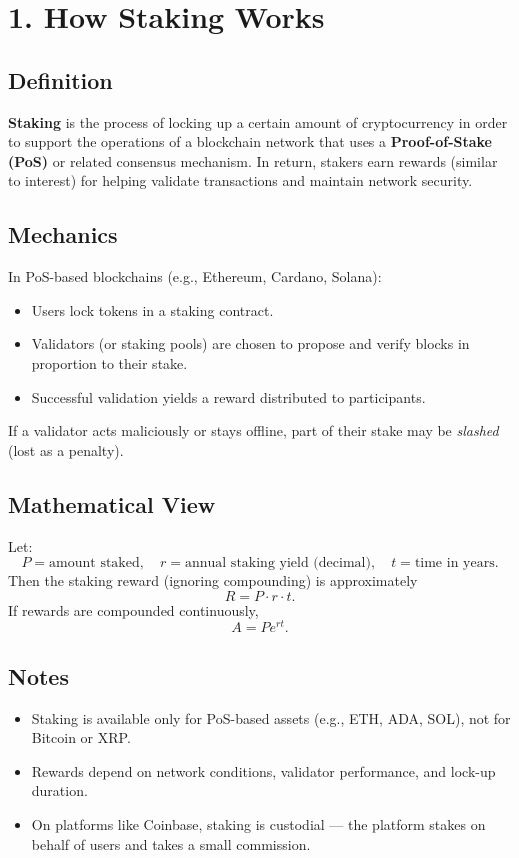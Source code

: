 \documentclass{article}
\begin{document}
\newpage




\section*{1. How Staking Works}

\subsection*{Definition}
\textbf{Staking} is the process of locking up a certain amount of cryptocurrency in order to support the operations of a blockchain network that uses a \textbf{Proof-of-Stake (PoS)} or related consensus mechanism. In return, stakers earn rewards (similar to interest) for helping validate transactions and maintain network security.

\subsection*{Mechanics}
In PoS-based blockchains (e.g., Ethereum, Cardano, Solana):
\begin{itemize}
  \item Users lock tokens in a staking contract.
  \item Validators (or staking pools) are chosen to propose and verify blocks in proportion to their stake.
  \item Successful validation yields a reward distributed to participants.
\end{itemize}

If a validator acts maliciously or stays offline, part of their stake may be \emph{slashed} (lost as a penalty).

\subsection*{Mathematical View}
Let:
\[
P = \text{amount staked}, \quad r = \text{annual staking yield (decimal)}, \quad t = \text{time in years}.
\]
Then the staking reward (ignoring compounding) is approximately
\[
R = P \cdot r \cdot t.
\]
If rewards are compounded continuously,
\[
A = P e^{r t}.
\]

\subsection*{Notes}
\begin{itemize}
  \item Staking is available only for PoS-based assets (e.g., ETH, ADA, SOL), not for Bitcoin or XRP.
  \item Rewards depend on network conditions, validator performance, and lock-up duration.
  \item On platforms like Coinbase, staking is custodial --- the platform stakes on behalf of users and takes a small commission.
\end{itemize}
\end{document}
